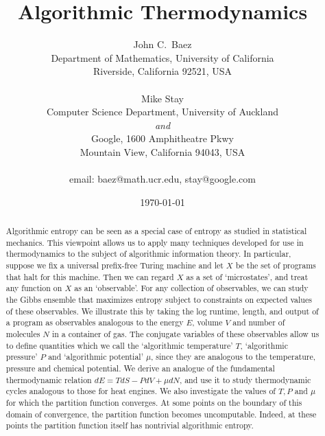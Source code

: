 \documentclass{article}
\begin{document}
\sloppy
     \title{Algorithmic Thermodynamics} 
     \author{{\small John C.\ Baez} \\
     {\small Department of Mathematics,  University of California} \\
     {\small Riverside, California 92521, USA} \\
     \\  
    {\small Mike Stay} \\
    {\small Computer Science Department, University of Auckland} \\
    {\small \it and} \\
    {\small Google, 1600 Amphitheatre Pkwy} \\
    {\small Mountain View, California 94043, USA}
    \\
    \\ {\small email: baez@math.ucr.edu, stay@google.com}
    \\
    }

\date{\today}
\maketitle

\begin{abstract}
\noindent
Algorithmic entropy can be seen as a special case of entropy as studied
in statistical mechanics.  This viewpoint allows us to apply many
techniques developed for use in thermodynamics to the subject of
algorithmic information theory.  In particular, suppose we fix a
universal prefix-free Turing machine and let $X$ be the set of
programs that halt for this machine.  Then we can regard $X$ as a set
of `microstates', and treat any function on $X$ as an `observable'.  For
any collection of observables, we can study the Gibbs ensemble that
maximizes entropy subject to constraints on expected values of these
observables.  We illustrate this by taking the log runtime, length,
and output of a program as observables analogous to the energy $E$,
volume $V$ and number of molecules $N$ in a container of gas.  The
conjugate variables of these observables allow us to define quantities
which we call the `algorithmic temperature' $T$, `algorithmic
pressure' $P$ and `algorithmic potential' $\mu$, since they are
analogous to the temperature, pressure and chemical potential.  We
derive an analogue of the fundamental thermodynamic relation $d E = T
dS - P d V + \mu d N$, and use it to study thermodynamic cycles
analogous to those for heat engines.  We also investigate the values
of $T, P$ and $\mu$ for which the partition function converges.  
At some points on the boundary of this domain of convergence, the 
partition function becomes uncomputable.  Indeed, at these points 
the partition function itself has nontrivial algorithmic entropy.
\end{abstract}
\end{document}
